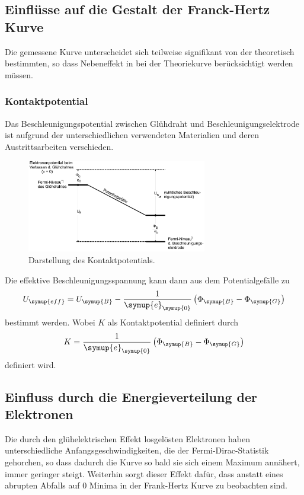 \subsection{Einflüsse auf die Gestalt der Franck-Hertz Kurve}
\label{sec:Einflüsse}
Die gemessene Kurve unterscheidet sich teilweise signifikant von der theoretisch bestimmten, so dass Nebeneffekt
in bei der Theoriekurve berücksichtigt werden müssen.

\subsubsection{Kontaktpotential}
\label{Kontaktpotential}
Das Beschleunigungspotential zwischen Glühdraht und Beschleunigungselektrode ist aufgrund der unterschiedlichen
verwendeten Materialien und deren Austrittsarbeiten verschieden.
\begin{figure}
    \centering
    \includegraphics[width=0.7\textwidth]{Bilder/Kontaktpotential.png}
    \caption{Darstellung des Kontaktpotentials.}
    \label{fig:Kontaktpotential}
\end{figure}
Die effektive Beschleunigungsspannung kann dann aus dem Potentialgefälle zu
\begin{equation}
    \label{eqn:Ueff}
    U_{\symup{eff}} = U_{\symup{B}} - \frac{1}{\symup{e}_{\symup{0}}}\left(\Phi_{\symup{B}}-\Phi_{\symup{G}}\right)
\end{equation}
bestimmt werden. Wobei $K$ als Kontaktpotential definiert durch
\begin{equation}
    \label{eqn:Kontaktpotential}
    K = \frac{1}{\symup{e}_{\symup{0}}}\left(\Phi_{\symup{B}}-\Phi_{\symup{G}}\right)
\end{equation}
definiert wird.

\subsection{Einfluss durch die Energieverteilung der Elektronen}
\label{sec:Energieverteilung}
Die durch den glühelektrischen Effekt losgelösten Elektronen haben unterschiedliche Anfangsgeschwindigkeiten,
die der Fermi-Dirac-Statistik gehorchen, so dass dadurch die Kurve so bald sie sich einem Maximum annähert,
immer geringer steigt. Weiterhin sorgt dieser Effekt dafür, dass anstatt eines abrupten Abfalls auf 0 Minima
in der Frank-Hertz Kurve zu beobachten sind.

